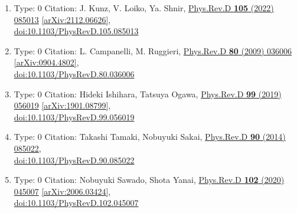 \documentclass[a4paper,10pt]{article}
\begin{document}
\begin{enumerate}
\begin{enumerate}
  \item Type: 0 Citation: J. Kunz, V. Loiko, Ya. Shnir, \href{https://www.doi.org/10.1103/PhysRevD.105.085013}{Phys.Rev.D {\bf 105} (2022) 085013}  \href{https://arxiv.org/abs/2112.06626}{[arXiv:2112.06626]},\\\href{https://www.doi.org/10.1103/PhysRevD.105.085013}{doi:10.1103/PhysRevD.105.085013}
  \item Type: 0 Citation: L. Campanelli, M. Ruggieri, \href{https://www.doi.org/10.1103/PhysRevD.80.036006}{Phys.Rev.D {\bf 80} (2009) 036006}  \href{https://arxiv.org/abs/0904.4802}{[arXiv:0904.4802]},\\\href{https://www.doi.org/10.1103/PhysRevD.80.036006}{doi:10.1103/PhysRevD.80.036006}
  \item Type: 0 Citation: Hideki Ishihara, Tatsuya Ogawa, \href{https://www.doi.org/10.1103/PhysRevD.99.056019}{Phys.Rev.D {\bf 99} (2019) 056019}  \href{https://arxiv.org/abs/1901.08799}{[arXiv:1901.08799]},\\\href{https://www.doi.org/10.1103/PhysRevD.99.056019}{doi:10.1103/PhysRevD.99.056019}
  \item Type: 0 Citation: Takashi Tamaki, Nobuyuki Sakai, \href{https://www.doi.org/10.1103/PhysRevD.90.085022}{Phys.Rev.D {\bf 90} (2014) 085022},\\\href{https://www.doi.org/10.1103/PhysRevD.90.085022}{doi:10.1103/PhysRevD.90.085022}
  \item Type: 0 Citation: Nobuyuki Sawado, Shota Yanai, \href{https://www.doi.org/10.1103/PhysRevD.102.045007}{Phys.Rev.D {\bf 102} (2020) 045007}  \href{https://arxiv.org/abs/2006.03424}{[arXiv:2006.03424]},\\\href{https://www.doi.org/10.1103/PhysRevD.102.045007}{doi:10.1103/PhysRevD.102.045007}

\end{enumerate}
\end{enumerate}
\end{document}
